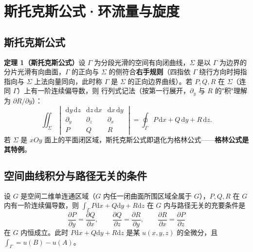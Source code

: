 
\section{斯托克斯公式·环流量与旋度}
\subsection{斯托克斯公式}

\textbf{定理 1（斯托克斯公式）}\quad 设 $\Gamma$ 为分段光滑的空间有向闭曲线，$\Sigma$ 是以 $\Gamma$ 为边界的分片光滑有向曲面，$\Gamma$ 的正向与 $\Sigma$ 的侧符合\textbf{右手规则}（四指依 $\Gamma$ 绕行方向时拇指指向与 $\Sigma$ 上法向量同向，此时称 $\Gamma$ 是 $\Sigma$ 的正向边界曲线）。若 $P,Q,R$ 在 $\Sigma$（连同 $\Gamma$）上有一阶连续偏导数，则
行列式记法（按第一行展开，$\partial_y$ 与 $R$ 的"积"理解为 $\partial R/\partial y$）：
\[
\iint_\Sigma
\begin{vmatrix}
\mathrm{d}y\,\mathrm{d}z & \mathrm{d}z\,\mathrm{d}x & \mathrm{d}x\,\mathrm{d}y\\
\partial_y & \partial_z & \partial_x\\
P & Q & R
\end{vmatrix}
=\oint_\Gamma P\,\mathrm{d}x+Q\,\mathrm{d}y+R\,\mathrm{d}z .
\]
若 $\Sigma$ 是 $xOy$ 面上的平面闭区域，斯托克斯公式即退化为格林公式——\textbf{格林公式是其特例}。

\subsection{空间曲线积分与路径无关的条件}

设 $G$ 是空间二维单连通区域（$G$ 内任一闭曲面所围区域全属于 $G$），$P,Q,R$ 在 $G$ 内有一阶连续偏导数，则 $\int_\Gamma P\mathrm{d}x+Q\mathrm{d}y+R\mathrm{d}z$ 在 $G$ 内与路径无关的充要条件是
\[
\frac{\partial P}{\partial y}=\frac{\partial Q}{\partial x},\qquad
\frac{\partial Q}{\partial z}=\frac{\partial R}{\partial y},\qquad
\frac{\partial R}{\partial x}=\frac{\partial P}{\partial z}
\]
在 $G$ 内恒成立。此时 $P\mathrm{d}x+Q\mathrm{d}y+R\mathrm{d}z$ 是某 $u(x,y,z)$ 的全微分，且 $\int_\Gamma=u(B)-u(A)$。

